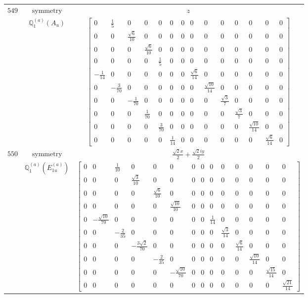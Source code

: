 \documentclass[fleqn,8pt,landscape]{jsarticle}
\begin{document}
\begin{longtable}{ccc}
$ 549 $ & $ \text{symmetry} $ & $ z $ \\
$  $ & $ \mathbb{Q}_{1}^{(a)}(A_{u}) $ & $ \begin{bmatrix} 0 & \frac{1}{5} & 0 & 0 & 0 & 0 & 0 & 0 & 0 & 0 & 0 & 0 & 0 & 0 \\ 0 & 0 & \frac{\sqrt{6}}{10} & 0 & 0 & 0 & 0 & 0 & 0 & 0 & 0 & 0 & 0 & 0 \\ 0 & 0 & 0 & \frac{\sqrt{6}}{10} & 0 & 0 & 0 & 0 & 0 & 0 & 0 & 0 & 0 & 0 \\ 0 & 0 & 0 & 0 & \frac{1}{5} & 0 & 0 & 0 & 0 & 0 & 0 & 0 & 0 & 0 \\ - \frac{1}{14} & 0 & 0 & 0 & 0 & 0 & 0 & \frac{\sqrt{6}}{14} & 0 & 0 & 0 & 0 & 0 & 0 \\ 0 & - \frac{3}{70} & 0 & 0 & 0 & 0 & 0 & 0 & \frac{\sqrt{10}}{14} & 0 & 0 & 0 & 0 & 0 \\ 0 & 0 & - \frac{1}{70} & 0 & 0 & 0 & 0 & 0 & 0 & \frac{\sqrt{3}}{7} & 0 & 0 & 0 & 0 \\ 0 & 0 & 0 & \frac{1}{70} & 0 & 0 & 0 & 0 & 0 & 0 & \frac{\sqrt{3}}{7} & 0 & 0 & 0 \\ 0 & 0 & 0 & 0 & \frac{3}{70} & 0 & 0 & 0 & 0 & 0 & 0 & \frac{\sqrt{10}}{14} & 0 & 0 \\ 0 & 0 & 0 & 0 & 0 & \frac{1}{14} & 0 & 0 & 0 & 0 & 0 & 0 & \frac{\sqrt{6}}{14} & 0 \end{bmatrix} $ \\ \hline
$ 550 $ & $ \text{symmetry} $ & $ \frac{\sqrt{2} x}{2} + \frac{\sqrt{2} i y}{2} $ \\
$  $ & $ \mathbb{Q}_{1}^{(a)}(E_{1u}^{(a)}) $ & $ \begin{bmatrix} 0 & 0 & \frac{1}{10} & 0 & 0 & 0 & 0 & 0 & 0 & 0 & 0 & 0 & 0 & 0 \\ 0 & 0 & 0 & \frac{\sqrt{3}}{10} & 0 & 0 & 0 & 0 & 0 & 0 & 0 & 0 & 0 & 0 \\ 0 & 0 & 0 & 0 & \frac{\sqrt{6}}{10} & 0 & 0 & 0 & 0 & 0 & 0 & 0 & 0 & 0 \\ 0 & 0 & 0 & 0 & 0 & \frac{\sqrt{10}}{10} & 0 & 0 & 0 & 0 & 0 & 0 & 0 & 0 \\ 0 & - \frac{\sqrt{10}}{70} & 0 & 0 & 0 & 0 & 0 & 0 & \frac{1}{14} & 0 & 0 & 0 & 0 & 0 \\ 0 & 0 & - \frac{2}{35} & 0 & 0 & 0 & 0 & 0 & 0 & \frac{\sqrt{3}}{14} & 0 & 0 & 0 & 0 \\ 0 & 0 & 0 & - \frac{3 \sqrt{2}}{70} & 0 & 0 & 0 & 0 & 0 & 0 & \frac{\sqrt{6}}{14} & 0 & 0 & 0 \\ 0 & 0 & 0 & 0 & - \frac{2}{35} & 0 & 0 & 0 & 0 & 0 & 0 & \frac{\sqrt{10}}{14} & 0 & 0 \\ 0 & 0 & 0 & 0 & 0 & - \frac{\sqrt{10}}{70} & 0 & 0 & 0 & 0 & 0 & 0 & \frac{\sqrt{15}}{14} & 0 \\ 0 & 0 & 0 & 0 & 0 & 0 & 0 & 0 & 0 & 0 & 0 & 0 & 0 & \frac{\sqrt{21}}{14} \end{bmatrix} $ \\ \hline

\end{longtable}
\end{document}
